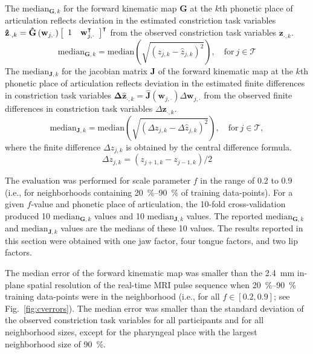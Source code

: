 \documentclass[preprint]{JASAnew}\usepackage[]{graphicx}\usepackage[]{color}
\begin{document}
The $\mathrm{median}_{\mathbf{G},k}$ for the forward kinematic map $\mathbf{G}$ at the $k$th phonetic place of articulation reflects deviation in the estimated constriction task variables $\mathbf{\hat{z}}_{\cdot,k} = \mathbf{\hat{G}}\left( \mathbf{w}_{j,\cdot} \right) \left[ \begin{array}{c c} 1 & \mathbf{w}_{j,\cdot}^\intercal \end{array} \right]^\intercal$ from the observed constriction task variables $\mathbf{z}_{\cdot,k}$.
%
\begin{equation}
\mathrm{median}_{\mathbf{G},k} = \mathrm{median} \left( \sqrt{ \left( z_{j,k} - \hat{z}_{j,k} \right)^2 } \right), \quad \text{for}~j\in\mathcal{T} 
\end{equation}
The $\mathrm{median}_{\mathbf{J},k}$ for the jacobian matrix $\mathbf{J}$ of the forward kinematic map at the $k$th phonetic place of articulation reflects deviation in the estimated finite differences in constriction task variables $\mathbf{\Delta \hat{z}}_{\cdot,k} = \mathbf{\hat{J}}\left( \mathbf{w}_{j,\cdot} \right) \Delta \mathbf{w}_{j,\cdot}$ from the observed finite differences in constriction task variables $\Delta \mathbf{z}_{\cdot,k}$.
%
\begin{equation}
\mathrm{median}_{\mathbf{J},k} = \mathrm{median} \left( \sqrt{ \left( \Delta z_{j,k} - \Delta \hat{z}_{j,k} \right)^2 } \right), \quad \text{for}~j\in\mathcal{T},
\end{equation}
%
where the finite difference $\Delta z_{j,k}$ is obtained by the central difference formula.
%
\begin{equation}
\Delta z_{j,k} = \left( z_{j+1,k} - z_{j-1,k} \right) / 2
\end{equation}


The evaluation was performed for scale parameter $f$ in the range of \num{0.2} to \num{0.9} (i.e., for neighborhoods containing \SIrange{20}{90}{\percent} of training data-points).
%
For a given $f$-value and phonetic place of articulation, the 10-fold cross-validation produced \num{10} $\mathrm{median}_{\mathbf{G},k}$ values and \num{10} $\mathrm{median}_{\mathbf{J},k}$ values.
%
The reported $\mathrm{median}_{\mathbf{G},k}$ and $\mathrm{median}_{\mathbf{J},k}$ values are the medians of these \num{10} values.
%
The results reported in this section were obtained with one jaw factor, four tongue factors, and two lip factors.



The median error of the forward kinematic map was smaller than the \SI{2.4}{\milli\meter} in-plane spatial resolution of the real-time MRI pulse sequence when \SIrange{20}{90}{\percent} training data-points were in the neighborhood (i.e., for all $f\in \left[ 0.2, 0.9\right]$; see Fig.~\ref{fig:cverrors}). The median error was smaller than the standard deviation of the observed constriction task variables for all participants and for all neighborhood sizes, except for the pharyngeal place with the largest neighborhood size of \SI{90}{\percent}.
\end{document}

